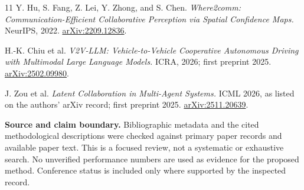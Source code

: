 \documentclass[10pt,a4paper]{article}
\newcommand{\note}[1]{\par\smallskip\noindent\colorbox{pale}{\parbox{\dimexpr\linewidth-2\fboxsep\relax}{#1}}\par\smallskip}
\begin{document}
\begin{thebibliography}{11}
 Y. Hu, S. Fang, Z. Lei, Y. Zhong, and S. Chen. \emph{Where2comm: Communication-Efficient Collaborative Perception via Spatial Confidence Maps.} NeurIPS, 2022. \href{https://arxiv.org/abs/2209.12836}{arXiv:2209.12836}.

 H.-K. Chiu et al. \emph{V2V-LLM: Vehicle-to-Vehicle Cooperative Autonomous Driving with Multimodal Large Language Models.} ICRA, 2026; first preprint 2025. \href{https://arxiv.org/abs/2502.09980}{arXiv:2502.09980}.

 J. Zou et al. \emph{Latent Collaboration in Multi-Agent Systems.} ICML 2026, as listed on the authors' arXiv record; first preprint 2025. \href{https://arxiv.org/abs/2511.20639}{arXiv:2511.20639}.
\end{thebibliography}

\vspace{8pt}
\note{\small\textbf{Source and claim boundary.} Bibliographic metadata and the cited methodological descriptions were checked against primary paper records and available paper text. This is a focused review, not a systematic or exhaustive search. No unverified performance numbers are used as evidence for the proposed method. Conference status is included only where supported by the inspected record.}
\end{document}
